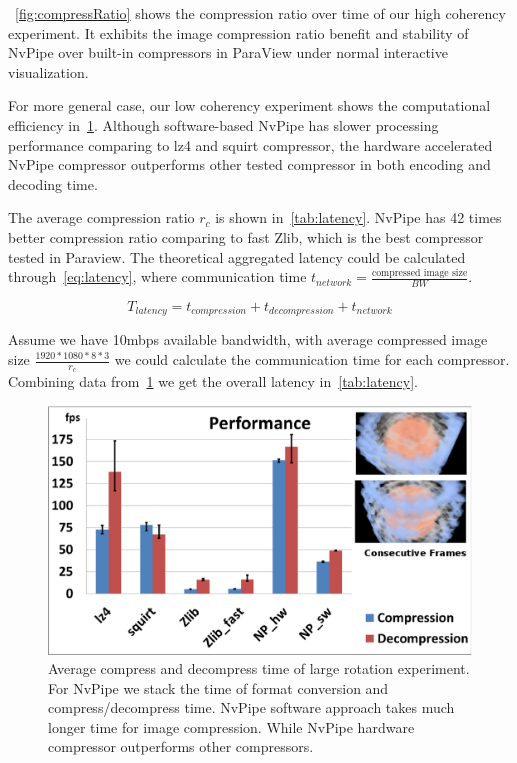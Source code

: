 \documentclass[review]{vgtc}                 %
\begin{document}
~\cref{fig:compressRatio} shows the compression ratio over time of our high coherency experiment. It exhibits the image compression ratio benefit and stability of NvPipe over built-in compressors in ParaView under normal interactive visualization.

For more general case, our low coherency experiment shows the computational efficiency in~\cref{fig:time}. Although software-based NvPipe has slower processing performance comparing to lz4 and squirt compressor, the hardware accelerated NvPipe compressor outperforms other tested compressor in both encoding and decoding time.

The average compression ratio \(r_c\) is shown in~\cref{tab:latency}. NvPipe has 42 times better compression ratio comparing to fast Zlib, which is the best compressor tested in Paraview.
The theoretical aggregated latency could be calculated through~\cref{eq:latency}, where communication time \(t_{network}=\frac{\text{compressed image size}}{BW}\). 

\begin{equation}
\label{eq:latency}
T_{latency}=t_{compression}+t_{decompression}+t_{network}
\end{equation}

Assume we have 10mbps available bandwidth, with average compressed image size \(\frac{1920*1080*8*3}{r_c}\) we could calculate the communication time for each compressor. Combining data from~\cref{fig:time} we get the overall latency in~\cref{tab:latency}.

\begin{figure}[t]
  \centering
  \includegraphics[width=\columnwidth]{Performance.eps}
  \caption{ Average compress and decompress time of large rotation experiment. For NvPipe we stack the time of format conversion and compress/decompress time. NvPipe software approach takes much longer time for image compression. While NvPipe hardware compressor outperforms other compressors.}
  \label{fig:time}
\end{figure}
\end{document}
